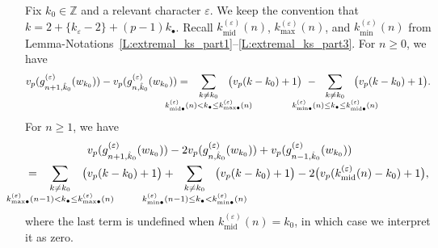 \begin{lemma}
    \label{L:increment_of_ghost_valuation}
    Fix $k_0 \in {\mathbb{Z}}$ and a relevant character $\varepsilon$.
    We keep the convention that $k = 2+\{k_\varepsilon-2\} + (p-1)k_\bullet$. Recall $k_{\mathrm{mid}}^{(\varepsilon)}(n)$, $k_{\max}^{(\varepsilon)}(n)$, and  $k_{\min}^{(\varepsilon)}(n)$ from Lemma-Notations~\ref{L:extremal_ks_part1}--\ref{L:extremal_ks_part3}.
    For $n \geq 0$, we have
    \begin{equation}
    \label{E:increment_of_ghost_series_valuation_1}
    v_p(g_{n+1, \hat k_0}^{(\varepsilon)}(w_{k_0})) - v_p(g_{n, \hat k_0}^{(\varepsilon)}(w_{k_0})) =  \hspace{-25pt}
    \sum_{\substack{
    k \neq k_0
    \\
    k^{(\varepsilon)}_{{\mathrm{mid}}\bullet}(n) < k_\bullet \leq k^{(\varepsilon)}_{{\max}\bullet}(n)}}
    \hspace{-25pt}\big( v_p(k-k_0)+1 \big)\ -  \hspace{-25pt} \sum_{\substack{
    k \neq k_0\\
    k^{(\varepsilon)}_{{\min}\bullet}(n) \leq k_\bullet \leq k^{(\varepsilon)}_{{{\mathrm{mid}}}\bullet}(n)}}
    \hspace{-25pt}\big( v_p(k-k_0)+1 \big).
    \end{equation}
    For $n \geq 1$, we have
    \begin{align}
    \label{E:increment_of_ghost_series_valuation_2}
    & v_p(g_{n+1, \hat k_0}^{(\varepsilon)}(w_{k_0})) -2v_p(g_{n, \hat k_0}^{(\varepsilon)}(w_{k_0}))  + v_p(g_{n-1, \hat k_0}^{(\varepsilon)}(w_{k_0}))
    \\
    \nonumber
    =\hspace{-30pt}
    \sum_{\substack{
    k \neq k_0\\
    k^{(\varepsilon)}_{{\max}\bullet}(n-1) < k_\bullet \leq k^{(\varepsilon)}_{{\max}\bullet}(n)}}
    \hspace{-30pt}\big(& v_p(k-k_0)+1 \big)
    +\hspace{-30pt}
    \sum_{\substack{
    k \neq k_0\\
    k^{(\varepsilon)}_{{\min}\bullet}(n-1) \leq k_\bullet < k^{(\varepsilon)}_{{\min}\bullet}(n)}}
    \hspace{-30pt}\big( v_p(k-k_0)+1 \big)
    -
    2 \big( v_p(k_{\mathrm{mid}}^{(\varepsilon)}(n) - k_0) + 1\big),
    \end{align}
    where the last term is undefined when $k_{{\mathrm{mid}}}^{(\varepsilon)}(n)= k_0$, in which case we interpret it as zero.
\end{lemma}

